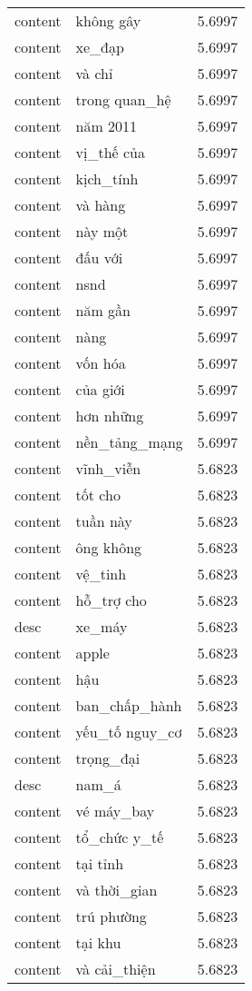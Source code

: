 \documentclass{article}
\begin{document}
\begin{tabular}{lll}
content & không gây & 5.6997\\
content & xe\_đạp & 5.6997\\
content & và chỉ & 5.6997\\
content & trong quan\_hệ & 5.6997\\
content & năm 2011 & 5.6997\\
content & vị\_thế của & 5.6997\\
content & kịch\_tính & 5.6997\\
content & và hàng & 5.6997\\
content & này một & 5.6997\\
content & đấu với & 5.6997\\
content & nsnd & 5.6997\\
content & năm gần & 5.6997\\
content & nàng & 5.6997\\
content & vốn hóa & 5.6997\\
content & của giới & 5.6997\\
content & hơn những & 5.6997\\
content & nền\_tảng\_mạng & 5.6997\\
content & vĩnh\_viễn & 5.6823\\
content & tốt cho & 5.6823\\
content & tuần này & 5.6823\\
content & ông không & 5.6823\\
content & vệ\_tinh & 5.6823\\
content & hỗ\_trợ cho & 5.6823\\
desc & xe\_máy & 5.6823\\
content & apple & 5.6823\\
content & hậu & 5.6823\\
content & ban\_chấp\_hành & 5.6823\\
content & yếu\_tố nguy\_cơ & 5.6823\\
content & trọng\_đại & 5.6823\\
desc & nam\_á & 5.6823\\
content & vé máy\_bay & 5.6823\\
content & tổ\_chức y\_tế & 5.6823\\
content & tại tỉnh & 5.6823\\
content & và thời\_gian & 5.6823\\
content & trú phường & 5.6823\\
content & tại khu & 5.6823\\
content & và cải\_thiện & 5.6823\\

\end{tabular}
\end{document}
